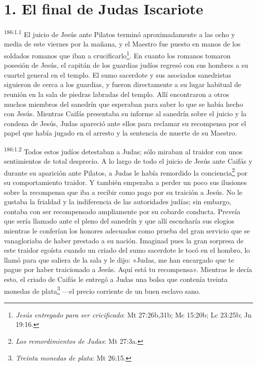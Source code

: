 \section*{1. El final de Judas Iscariote}
\par
\textsuperscript{186:1.1} El juicio de Jesús ante Pilatos terminó aproximadamente a las ocho y media de este viernes por la mañana, y el Maestro fue puesto en manos de los soldados romanos que iban a crucificarlo\footnote{\textit{Jesús entregado para ser cricificado}: Mt 27:26b,31b; Mc 15:20b; Lc 23:25b; Jn 19:16.}. En cuanto los romanos tomaron posesión de Jesús, el capitán de los guardias judíos regresó con sus hombres a su cuartel general en el templo. El sumo sacerdote y sus asociados sanedristas siguieron de cerca a los guardias, y fueron directamente a su lugar habitual de reunión en la sala de piedras labradas del templo. Allí encontraron a otros muchos miembros del sanedrín que esperaban para saber lo que se había hecho con Jesús. Mientras Caifás presentaba su informe al sanedrín sobre el juicio y la condena de Jesús, Judas apareció ante ellos para reclamar su recompensa por el papel que había jugado en el arresto y la sentencia de muerte de su Maestro.

\par
\textsuperscript{186:1.2} Todos estos judíos detestaban a Judas; sólo miraban al traidor con unos sentimientos de total desprecio. A lo largo de todo el juicio de Jesús ante Caifás y durante su aparición ante Pilatos, a Judas le había remordido la conciencia\footnote{\textit{Los remordimientos de Judas}: Mt 27:3a.} por su comportamiento traidor. Y también empezaba a perder un poco sus ilusiones sobre la recompensa que iba a recibir como pago por su traición a Jesús. No le gustaba la frialdad y la indiferencia de las autoridades judías; sin embargo, contaba con ser recompensado ampliamente por su cobarde conducta. Preveía que sería llamado ante el pleno del sanedrín y que allí escucharía sus elogios mientras le conferían los honores adecuados como prueba del gran servicio que se vanagloriaba de haber prestado a su nación. Imaginad pues la gran sorpresa de este traidor egoísta cuando un criado del sumo sacerdote le tocó en el hombro, lo llamó para que saliera de la sala y le dijo: «Judas, me han encargado que te pague por haber traicionado a Jesús. Aquí está tu recompensa». Mientras le decía esto, el criado de Caifás le entregó a Judas una bolsa que contenía treinta monedas de plata\footnote{\textit{Treinta monedas de plata}: Mt 26:15.} ---el precio corriente de un buen esclavo sano.

